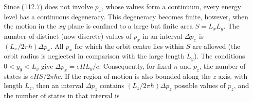 Since (112.7) does not involve $p_x$, whose values form a continuum, every energy level has a continuous degeneracy. This degeneracy becomes finite, however, when the motion in the $xy$ plane is confined to a large but finite area $S=L_xL_y$. The number of distinct (now discrete) values of $p_x$ in an interval $\Delta p_x$ is $(L_x/2\pi\hbar)\Delta p_x$. All $p_x$ for which the orbit centre lies within $S$ are allowed (the orbit radius is neglected in comparison with the large length $L_y$). The conditions $0<y_0<L_y$ give $\Delta p_x=eHL_y/c$. Consequently, for fixed $n$ and $p_z$, the number of states is $eHS/2\pi\hbar c$. If the region of motion is also bounded along the $z$ axis, with length $L_z$, then an interval $\Delta p_z$ contains $(L_z/2\pi\hbar)\Delta p_z$ possible values of $p_z$, and the number of states in that interval is

